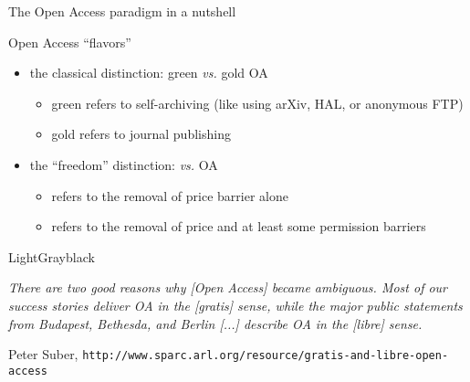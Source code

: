 \documentclass[10pt,xcolor=svgnames]{beamer}
\begin{document}
\begin{frame}{The Open Access paradigm in a nutshell}

  \begin{block}{Open Access ``flavors''}
    \begin{itemize}
      \item<1-> the classical distinction: {\color{LimeGreen}green} \emph{vs.} {\color{Gold}gold} OA
        \begin{itemize}
          \item {\color{LimeGreen}green} refers to self-archiving (like using arXiv, HAL, or anonymous FTP)
          \item {\color{Gold}gold} refers to journal publishing
        \end{itemize}
      \item<2-> the ``freedom'' distinction:  \emph{vs.}  OA
        \begin{itemize}
          \item {} refers to the removal of price barrier alone
          \item {} refers to the removal of price and at least some permission barriers
        \end{itemize}
    \end{itemize}
  \end{block}
  
  \begin{overprint}
    \begin{colorblock}{LightGray}{black}{}
      {\scriptsize\emph{There are two good reasons why [\emph{Open Access}] became ambiguous. Most of our success stories deliver OA in the [\emph{gratis}] sense, while the major public statements from Budapest, Bethesda, and Berlin [...] describe OA in the [\emph{libre}] sense.}
        
        Peter Suber, \texttt{http://www.sparc.arl.org/resource/gratis-and-libre-open-access}}
    \end{colorblock}
  \end{overprint}

\end{frame}
\end{document}
